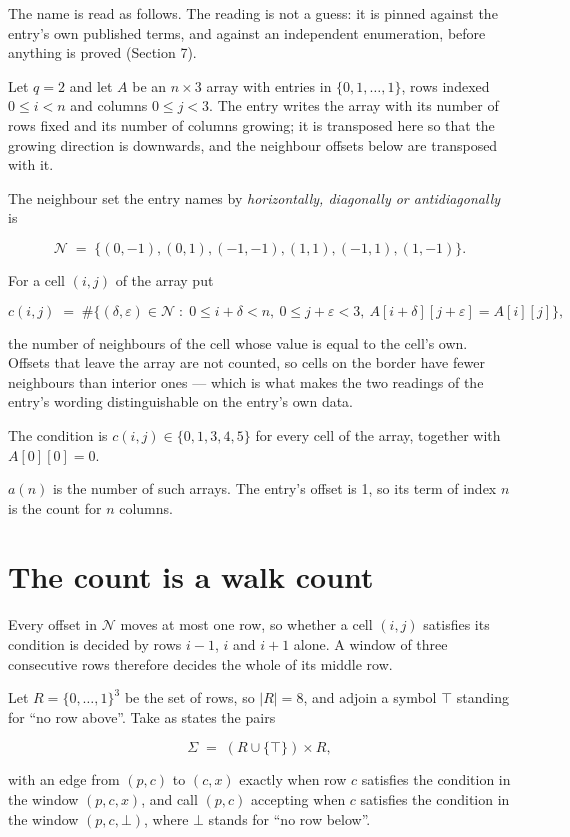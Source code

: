 \documentclass[11pt]{article}
\theoremstyle{definition}
\begin{document}
The name is read as follows. The reading is not a guess: it is pinned against the entry's own published terms, and against an independent enumeration, before anything is proved (Section 7).

Let $q = 2$ and let $A$ be an $n \times 3$ array with entries in $\{0,1,\dots,1\}$, rows indexed $0 \le i < n$ and columns $0 \le j < 3$. The entry writes the array with its number of rows fixed and its number of columns growing; it is transposed here so that the growing direction is downwards, and the neighbour offsets below are transposed with it.

The neighbour set the entry names by {\itshape horizontally, diagonally or antidiagonally} is

\[\mathcal{N} \;=\; \{(0,-1), (0,1), (-1,-1), (1,1), (-1,1), (1,-1)\}.\]

For a cell $(i,j)$ of the array put

\[c(i,j) \;=\; \#\bigl\{(\delta,\varepsilon)\in\mathcal{N} \;:\; 0\le i+\delta<n,\ 0\le j+\varepsilon<3,\ A[i+\delta][j+\varepsilon] = A[i][j]\bigr\},\]

the number of neighbours of the cell whose value is equal to the cell's own. Offsets that leave the array are not counted, so cells on the border have fewer neighbours than interior ones --- which is what makes the two readings of the entry's wording distinguishable on the entry's own data.

The condition is $c(i,j) \in \{0, 1, 3, 4, 5\}$ for every cell of the array, together with $A[0][0]=0$.

$a(n)$ is the number of such arrays. The entry's offset is 1, so its term of index $n$ is the count for $n$ columns.

\section{The count is a walk count}

Every offset in $\mathcal{N}$ moves at most one row, so whether a cell $(i,j)$ satisfies its condition is decided by rows $i-1$, $i$ and $i+1$ alone. A window of three consecutive rows therefore decides the whole of its middle row.

Let $R = \{0,\dots,1\}^{3}$ be the set of rows, so $|R| = 8$, and adjoin a symbol $\top$ standing for ``no row above''. Take as states the pairs

\[\Sigma \;=\; (R \cup \{\top\}) \times R,\]

with an edge from $(p,c)$ to $(c,x)$ exactly when row $c$ satisfies the condition in the window $(p,c,x)$, and call $(p,c)$ accepting when $c$ satisfies the condition in the window $(p,c,\bot)$, where $\bot$ stands for ``no row below''.
\end{document}

